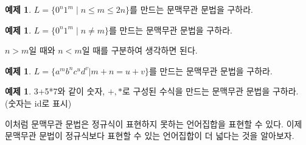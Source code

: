 \documentclass[b5paper, 10pt]{book}
\theoremstyle{definition}
\newtheorem{ex}[defn]{예제}
\begin{document}
\begin{ex} $L = \{ 0^n 1^m \; \vert \; n \le m \le 2n\}$를 만드는 문맥무관 문법을 구하라.
\end{ex}
\begin{ex} 
    $L = \{ 0^n 1^m \; \vert \; n \neq m\}$를 만드는 문맥무관 문법을 구하라.
\end{ex}
$n>m$일 때와 $n < m$일 때를 구분하여 생각하면 된다.
\begin{ex} $L = \{ a^m b^n c^u d^v \vert m+n = u+v\}$를 만드는 문맥무관 문법을 구하라.
\end{ex}
\begin{ex} \label{3+5*7}
    3+5*7와 같이 숫자, $+, *$로 구성된 수식을 만드는 문맥무관 문법을 구하라. (숫자는 id로 표시)
\end{ex}
이처럼 문맥무관 문법은 정규식이 표현하지 못하는 언어집합을 표현할 수 있다.
이제 문맥무관 문법이 정규식보다 표현할 수 있는 언어집합이 더 넓다는 것을 알아보자.
\end{document}
